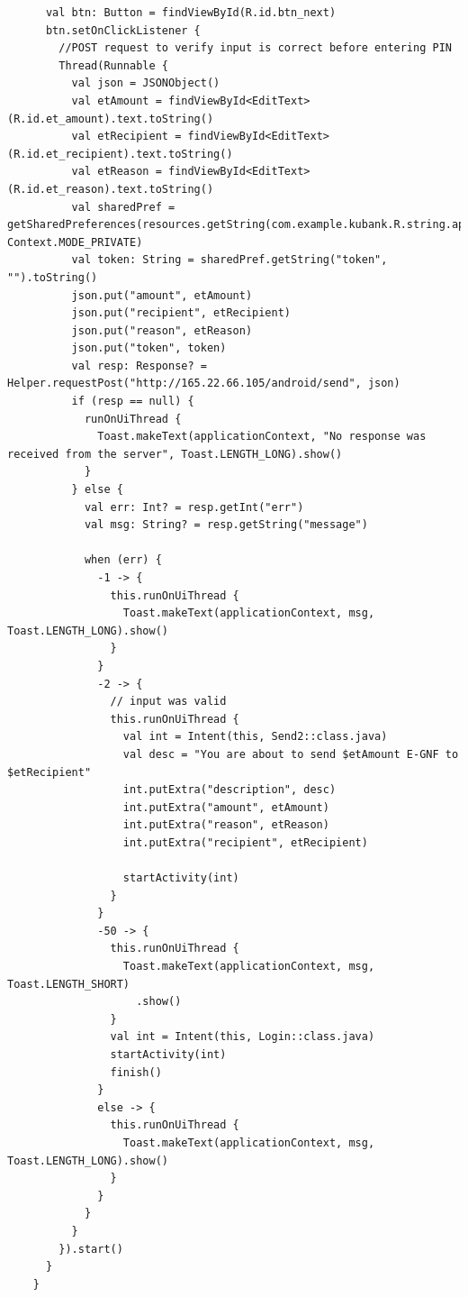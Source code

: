 \documentclass[11pt, a4paper]{article}
\begin{document}
\begin{appendices}
\begin{lstlisting}
      val btn: Button = findViewById(R.id.btn_next)
      btn.setOnClickListener {
        //POST request to verify input is correct before entering PIN
        Thread(Runnable {
          val json = JSONObject()
          val etAmount = findViewById<EditText>(R.id.et_amount).text.toString()
          val etRecipient = findViewById<EditText>(R.id.et_recipient).text.toString()
          val etReason = findViewById<EditText>(R.id.et_reason).text.toString()
          val sharedPref = getSharedPreferences(resources.getString(com.example.kubank.R.string.app_name), Context.MODE_PRIVATE)
          val token: String = sharedPref.getString("token", "").toString()
          json.put("amount", etAmount)
          json.put("recipient", etRecipient)
          json.put("reason", etReason)
          json.put("token", token)
          val resp: Response? = Helper.requestPost("http://165.22.66.105/android/send", json)
          if (resp == null) {
            runOnUiThread {
              Toast.makeText(applicationContext, "No response was received from the server", Toast.LENGTH_LONG).show()
            }
          } else {
            val err: Int? = resp.getInt("err")
            val msg: String? = resp.getString("message")

            when (err) {
              -1 -> {
                this.runOnUiThread {
                  Toast.makeText(applicationContext, msg, Toast.LENGTH_LONG).show()
                }
              }
              -2 -> {
                // input was valid
                this.runOnUiThread {
                  val int = Intent(this, Send2::class.java)
                  val desc = "You are about to send $etAmount E-GNF to $etRecipient"
                  int.putExtra("description", desc)
                  int.putExtra("amount", etAmount)
                  int.putExtra("reason", etReason)
                  int.putExtra("recipient", etRecipient)

                  startActivity(int)
                }
              }
              -50 -> {
                this.runOnUiThread {
                  Toast.makeText(applicationContext, msg, Toast.LENGTH_SHORT)
                    .show()
                }
                val int = Intent(this, Login::class.java)
                startActivity(int)
                finish()
              }
              else -> {
                this.runOnUiThread {
                  Toast.makeText(applicationContext, msg, Toast.LENGTH_LONG).show()
                }
              }
            }
          }
        }).start()
      }
    }



\end{lstlisting}
\end{appendices}
\end{document}
